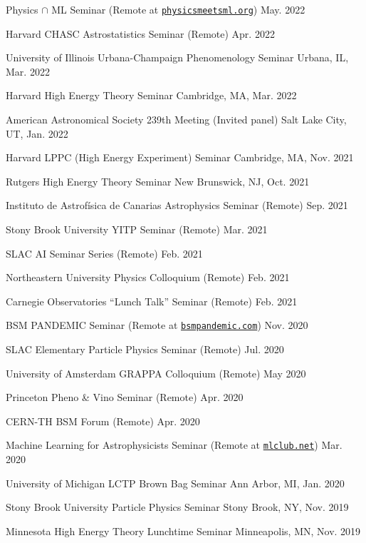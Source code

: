 \documentclass[letterpaper,11pt]{article}
\newenvironment{packed_itemize}{
\begin{itemize}[label=\raisebox{0.25ex}{\tiny$\bullet$}]
  \setlength{\itemsep}{4.2pt}
  \setlength{\parskip}{0pt}
  \setlength{\parsep}{0pt}}{\end{itemize}
}
\begin{document}
\begin{packed_itemize}
  \item Physics $\cap$ ML Seminar (Remote at \href{http://www.physicsmeetsml.org//}{\texttt{physicsmeetsml.org}}) \hfill May. 2022
  \item Harvard CHASC Astrostatistics Seminar (Remote)  \hfill Apr. 2022
  \item University of Illinois Urbana-Champaign Phenomenology Seminar  \hfill Urbana, IL, Mar. 2022
  \item Harvard High Energy Theory Seminar \hfill Cambridge, MA, Mar. 2022
  \item American Astronomical Society 239th Meeting (Invited panel)  \hfill Salt Lake City, UT, Jan. 2022
  \item Harvard LPPC (High Energy Experiment) Seminar \hfill Cambridge, MA, Nov. 2021
  \item Rutgers High Energy Theory Seminar \hfill New Brunswick, NJ, Oct. 2021
  \item Instituto de Astrof\'{i}sica de Canarias Astrophysics Seminar (Remote) \hfill Sep. 2021
  \item Stony Brook University YITP Seminar (Remote) \hfill Mar. 2021
  \item SLAC AI Seminar Series (Remote) \hfill Feb. 2021
  \item Northeastern University Physics Colloquium (Remote) \hfill Feb. 2021
  \item Carnegie Observatories ``Lunch Talk'' Seminar (Remote) \hfill Feb. 2021
  \item BSM PANDEMIC Seminar  (Remote at \href{https://www.bsmpandemic.com/}{\texttt{bsmpandemic.com}}) \hfill Nov. 2020
  \item SLAC Elementary Particle Physics Seminar (Remote) \hfill Jul. 2020
  \item University of Amsterdam GRAPPA Colloquium (Remote) \hfill May 2020
  \item Princeton Pheno \& Vino Seminar (Remote) \hfill Apr. 2020
  \item CERN-TH BSM Forum (Remote) \hfill  Apr. 2020
  \item Machine Learning for Astrophysicists Seminar (Remote at \href{https://docs.google.com/document/d/1GGtE-YIuAWlmpKSr38_kyiF-Fklszhkh4FkiYWzBAho/pub}{\texttt{mlclub.net}}) \hfill  Mar. 2020
  \item University of Michigan LCTP Brown Bag Seminar \hfill Ann Arbor, MI, Jan. 2020
  \item Stony Brook University Particle Physics Seminar \hfill Stony Brook, NY, Nov. 2019
  \item Minnesota High Energy Theory Lunchtime Seminar \hfill  Minneapolis, MN, Nov. 2019

\end{packed_itemize}
\end{document}
